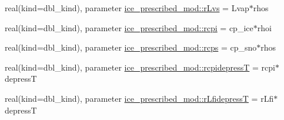 \begin{DoxyCompactItemize}
\item 
real(kind=dbl\_\-kind), parameter \hyperlink{namespaceice__prescribed__mod_a4dfc1b519ac719ccd1df0821e2ee9d05}{ice\_\-prescribed\_\-mod::rLvs} = Lvap$\ast$rhos
\item 
real(kind=dbl\_\-kind), parameter \hyperlink{namespaceice__prescribed__mod_ad7fb751647d1c0fce8353923c934dcd1}{ice\_\-prescribed\_\-mod::rcpi} = cp\_\-ice$\ast$rhoi
\item 
real(kind=dbl\_\-kind), parameter \hyperlink{namespaceice__prescribed__mod_a4d489995be632463ce884c66d364ae9b}{ice\_\-prescribed\_\-mod::rcps} = cp\_\-sno$\ast$rhos
\item 
real(kind=dbl\_\-kind), parameter \hyperlink{namespaceice__prescribed__mod_a1c5ca290fc59d5ca3c0587261be63bfa}{ice\_\-prescribed\_\-mod::rcpidepressT} = rcpi$\ast$depressT
\item 
real(kind=dbl\_\-kind), parameter \hyperlink{namespaceice__prescribed__mod_a5331e73657db370f6bc527f0e680a647}{ice\_\-prescribed\_\-mod::rLfidepressT} = rLfi$\ast$depressT
\end{DoxyCompactItemize}
